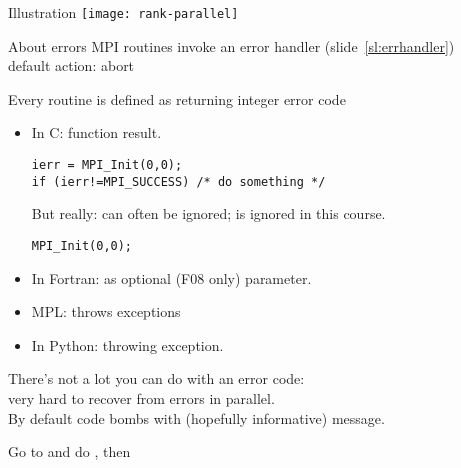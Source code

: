 \begin{exerciseframe}[commrank]
  
\end{exerciseframe}

\begin{exerciseframe}[commrank]
  
\end{exerciseframe}

\begin{numberedframe}{Illustration}
  \texttt{[image: rank-parallel]}
\end{numberedframe}

\begin{numberedframe}{About errors}
  MPI routines invoke an error handler (slide~\ref{sl:errhandler})\\
  default action: abort
  
  Every routine is defined as returning integer error code
  \begin{itemize}
  \item In C: function result. 
\lstset{language=C++}
\begin{lstlisting}
ierr = MPI_Init(0,0);
if (ierr!=MPI_SUCCESS) /* do something */
\end{lstlisting}
  But really: can often be ignored; is ignored in this course.
\begin{lstlisting}
MPI_Init(0,0);
\end{lstlisting}
  \item In Fortran: as optional (F08 only) parameter.
  \item MPL: throws exceptions
  \item In Python: throwing exception.
  \end{itemize}
  There's not a lot you can do with an error code:\\
  very hard to recover from errors in parallel.\\
  By default code bombs with (hopefully informative) message.
\end{numberedframe}



\begin{exerciseframe}
  

  Go to  and do ,
  then 
\end{exerciseframe}

